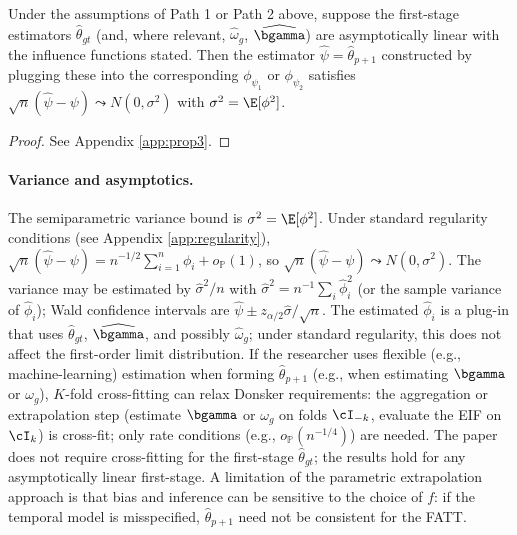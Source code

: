 \documentclass{article}
\renewcommand{\P}{\mathbb{P}}
\begin{document}
\begin{proposition}\label{prop:asymp}
Under the assumptions of Path 1 or Path 2 above, suppose the first-stage estimators $\widehat{\theta}_{gt}$ (and, where relevant, $\widehat{\omega}_g$, $\widehat{\bgamma}$) are asymptotically linear with the influence functions stated. Then the estimator $\widehat{\psi} = \widehat{\theta}_{p+1}$ constructed by plugging these into the corresponding $\phi_{\psi_1}$ or $\phi_{\psi_2}$ satisfies $\sqrt{n}(\widehat{\psi} - \psi) \leadsto N(0, \sigma^2)$ with $\sigma^2 = \E[\phi^2]$.
\end{proposition}

\begin{proof}
See Appendix \ref{app:prop3}.
\end{proof}

\paragraph{Variance and asymptotics.} The semiparametric variance bound is $\sigma^2 = \E[\phi^2]$. Under standard regularity conditions (see Appendix \ref{app:regularity}), $\sqrt{n}(\widehat{\psi} - \psi) = n^{-1/2}\sum_{i=1}^n \phi_i + o_{\P}(1)$, so $\sqrt{n}(\widehat{\psi} - \psi) \leadsto N(0, \sigma^2)$. The variance may be estimated by $\widehat{\sigma}^2/n$ with $\widehat{\sigma}^2 = n^{-1}\sum_i \widehat{\phi}_i^2$ (or the sample variance of $\widehat{\phi}_i$); Wald confidence intervals are $\widehat{\psi} \pm z_{\alpha/2} \widehat{\sigma}/\sqrt{n}$. The estimated $\widehat{\phi}_i$ is a plug-in that uses $\widehat{\theta}_{gt}$, $\widehat{\bgamma}$, and possibly $\widehat{\omega}_g$; under standard regularity, this does not affect the first-order limit distribution. If the researcher uses flexible (e.g., machine-learning) estimation when forming $\widehat{\theta}_{p+1}$ (e.g., when estimating $\bgamma$ or $\omega_g$), $K$-fold cross-fitting can relax Donsker requirements: the aggregation or extrapolation step (estimate $\bgamma$ or $\omega_g$ on folds $\cI_{-k}$, evaluate the EIF on $\cI_k$) is cross-fit; only rate conditions (e.g., $o_{\P}(n^{-1/4})$) are needed. The paper does not require cross-fitting for the first-stage $\widehat{\theta}_{gt}$; the results hold for any asymptotically linear first-stage. A limitation of the parametric extrapolation approach is that bias and inference can be sensitive to the choice of $f$: if the temporal model is misspecified, $\widehat{\theta}_{p+1}$ need not be consistent for the FATT.
\end{document}
